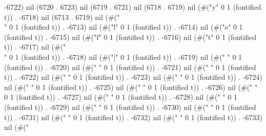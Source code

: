 -6722) nil (6720 . 6723) nil (6719 . 6721) nil (6718 . 6719) nil (#("y" 0 1 (fontified t)) . -6718) nil (6713 . 6719) nil (#("\\" 0 1 (fontified t)) . -6713) nil (#("l" 0 1 (fontified t)) . -6714) nil (#("e" 0 1 (fontified t)) . -6715) nil (#("f" 0 1 (fontified t)) . -6716) nil (#("t" 0 1 (fontified t)) . -6717) nil (#("\\" 0 1 (fontified t)) . -6718) nil (#("[" 0 1 (fontified t)) . -6719) nil (#("
" 0 1 (fontified t)) . -6720) nil (#("	" 0 1 (fontified t)) . -6721) nil (#("	" 0 1 (fontified t)) . -6722) nil (#("	" 0 1 (fontified t)) . -6723) nil (#("	" 0 1 (fontified t)) . -6724) nil (#("	" 0 1 (fontified t)) . -6725) nil (#("	" 0 1 (fontified t)) . -6726) nil (#(" " 0 1 (fontified t)) . -6727) nil (#(" " 0 1 (fontified t)) . -6728) nil (#(" " 0 1 (fontified t)) . -6729) nil (#(" " 0 1 (fontified t)) . -6730) nil (#(" " 0 1 (fontified t)) . -6731) nil (#(" " 0 1 (fontified t)) . -6732) nil (#(" " 0 1 (fontified t)) . -6733) nil (#("
